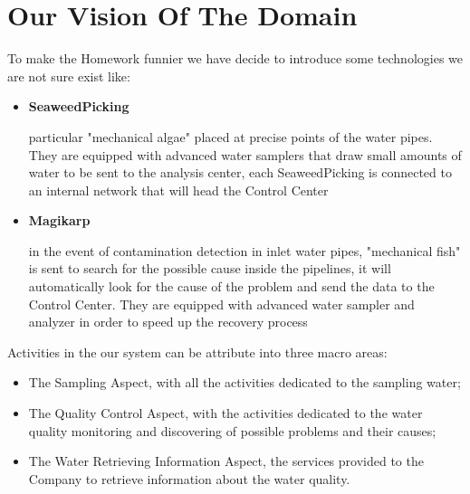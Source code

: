 \chapter{\textbf{Our Vision Of The Domain}}
To make the Homework funnier we have decide to introduce some technologies we are not sure exist like:

\begin{itemize}
\item {\large \textbf{SeaweedPicking}}

\begin{description}
\par particular "mechanical algae" placed at precise points of the water pipes. They are equipped with advanced water samplers that draw small amounts of water to be sent to the analysis center, each SeaweedPicking is connected to an internal network that will head the Control Center
\end{description}

\item {\large \textbf{Magikarp}}

\begin{description}
\par in the event of contamination detection in inlet water pipes, "mechanical fish" is sent to search for the possible cause inside the pipelines, it will automatically look for the cause of the problem and send the data to the Control Center. They are equipped with advanced water sampler and analyzer in order to speed up the recovery process
\end{description}
 
\end{itemize}

Activities in the our system can be attribute into three macro areas:

\begin{itemize}
\item The Sampling Aspect, with all the activities dedicated to the sampling water;
\item The Quality Control Aspect, with the activities dedicated to the water quality monitoring and discovering of possible problems and their causes;
\item The Water Retrieving Information Aspect, the services provided to the Company to retrieve information about the water quality.
\end{itemize}


